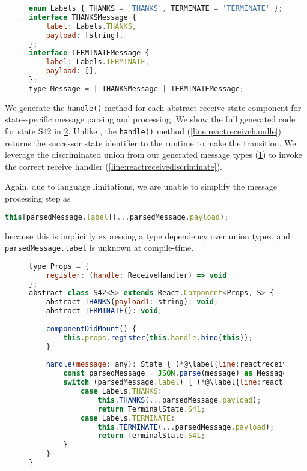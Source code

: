 \begin{figure}[!h]
\begin{lstlisting}[language=javascript,tabsize=2]
enum Labels { THANKS = 'THANKS', TERMINATE = 'TERMINATE' };
interface THANKSMessage {
    label: Labels.THANKS,
    payload: [string],
};
interface TERMINATEMessage {
    label: Labels.TERMINATE,
    payload: [],
};
type Message = | THANKSMessage | TERMINATEMessage;
\end{lstlisting}
\label{lst:reactreceivetypes}
\end{figure}
	
We generate the \texttt{handle()} method for each
abstract receive state component for state-specific message
parsing and processing. We show the full generated code
for state S42 in \cref{lst:reactreceivecomponent}.
Unlike ,
the \texttt{handle()} method (\cref{line:reactreceivehandle})
returns the successor state identifier to the runtime
to make the transition.
We leverage the discriminated union from our
generated message types (\cref{lst:reactreceivetypes})
to invoke the correct receive handler (\cref{line:reactreceivediscriminate}).

Again, due to language limitations, we are unable to 
simplify the message processing step as

\begin{lstlisting}[language=javascript,numbers=none]
this[parsedMessage.label](...parsedMessage.payload);
\end{lstlisting}

because this is implicitly expressing a type dependency
over union types,
and \texttt{parsedMessage.label} is unknown at compile-time.

\begin{figure}[!h]
\begin{lstlisting}[language=javascript,tabsize=2]
type Props = {
	register: (handle: ReceiveHandler) => void
};
abstract class S42<S> extends React.Component<Props, S> {
	abstract THANKS(payload1: string): void;
	abstract TERMINATE(): void;
	
	componentDidMount() {
		this.props.register(this.handle.bind(this));
	}
	
	handle(message: any): State { (*@\label{line:reactreceivehandle}@*)
		const parsedMessage = JSON.parse(message) as Message;
		switch (parsedMessage.label) { (*@\label{line:reactreceivediscriminate}@*)
			case Labels.THANKS:
				this.THANKS(...parsedMessage.payload);
				return TerminalState.S41;
			case Labels.TERMINATE:
				this.TERMINATE(...parsedMessage.payload);
				return TerminalState.S41;
		}
	}
}
\end{lstlisting}
\label{lst:reactreceivecomponent}
\end{figure}

